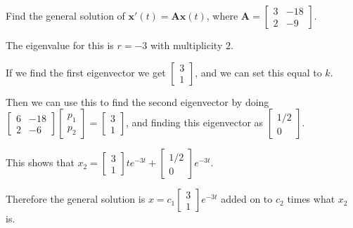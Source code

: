\documentclass[../diffeq.tex]{subfiles}
\begin{document}
\pagebreak
\begin{example}
    Find the general solution of $\textbf{x}'(t)=\textbf{Ax}(t)$, where $\textbf{A}=\begin{bmatrix}
        3 & -18\\
        2 & -9
    \end{bmatrix}$.

    The eigenvalue for this is $r=-3$ with multiplicity $2$.

    If we find the first eigenvector we get $\begin{bmatrix}
        3\\1
    \end{bmatrix}$, and we can set this equal to $k$.

    Then we can use this to find the second eigenvector by doing $\begin{bmatrix}
        6 & -18 \\
        2 & -6
    \end{bmatrix}\begin{bmatrix}
        p_1\\p_2
    \end{bmatrix}=\begin{bmatrix}
        3\\1
    \end{bmatrix}$, and finding this eigenvector as $\begin{bmatrix}
        1/2 \\ 0
    \end{bmatrix}$.

    This shows that $x_2=\begin{bmatrix}
        3\\1
    \end{bmatrix}te^{-3t}+\begin{bmatrix}
        1/2 \\ 0 
    \end{bmatrix}e^{-3t}$.

    Therefore the general solution is $x=c_1\begin{bmatrix}
        3\\1
    \end{bmatrix}e^{-3t}$ added on to $c_2$ times what $x_2$ is.
\end{example}
\end{document}
